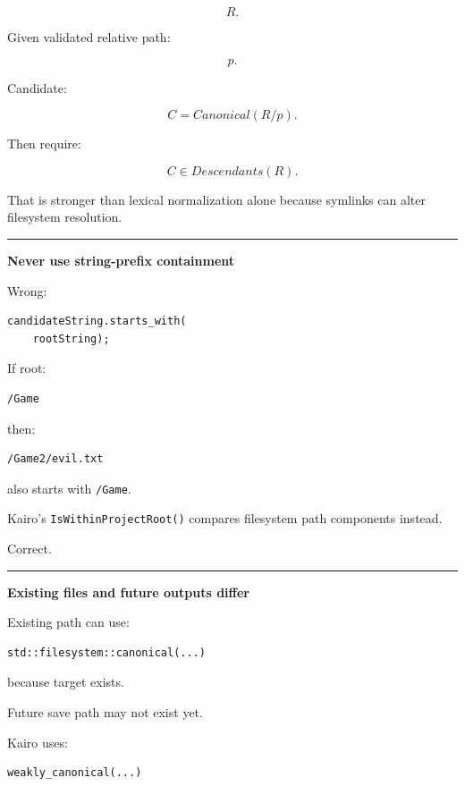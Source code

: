\[
R.
\]

Given validated relative path:

\[
p.
\]

Candidate:

\[
C=Canonical(R/p).
\]

Then require:

\[
C\in Descendants(R).
\]

That is stronger than lexical normalization alone because symlinks can alter filesystem resolution.

\begin{center}\rule{0.5\linewidth}{0.5pt}\end{center}

\textbf{Never use string-prefix containment}

Wrong:

\begin{verbatim}
candidateString.starts_with(
    rootString);
\end{verbatim}

If root:

\begin{verbatim}
/Game
\end{verbatim}

then:

\begin{verbatim}
/Game2/evil.txt
\end{verbatim}

also starts with \texttt{/Game}.

Kairo's \texttt{IsWithinProjectRoot()} compares filesystem path components instead.

Correct.

\begin{center}\rule{0.5\linewidth}{0.5pt}\end{center}

\textbf{Existing files and future outputs differ}

Existing path can use:

\begin{verbatim}
std::filesystem::canonical(...)
\end{verbatim}

because target exists.

Future save path may not exist yet.

Kairo uses:

\begin{verbatim}
weakly_canonical(...)
\end{verbatim}

